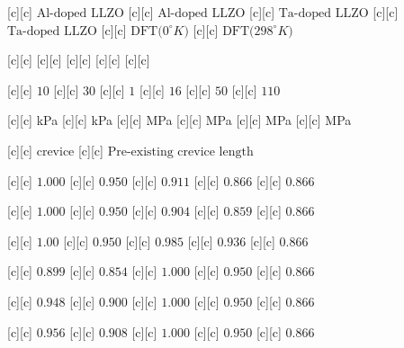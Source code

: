 [c][c] {$\text{Al-doped LLZO}$}
[c][c] {$\text{Al-doped LLZO}$}
[c][c] {$\text{Ta-doped LLZO}$}
[c][c] {$\text{Ta-doped LLZO}$}
[c][c] {$\text{DFT($0^{\circ}K$)}$}
[c][c] {$\text{DFT($298^{\circ}K$)}$}

[c][c] {} 
[c][c] {} 
[c][c] {}
[c][c] {}
[c][c] {}

[c][c] {\footnotesize $10$}
[c][c] {\footnotesize $30$}
[c][c] {\footnotesize $1$}
[c][c] {\footnotesize $16$}
[c][c] {\footnotesize $50$}
[c][c] {\footnotesize $110$}

[c][c] {\footnotesize kPa}
[c][c] {\footnotesize kPa}
[c][c] {\footnotesize MPa}
[c][c] {\footnotesize MPa}
[c][c] {\footnotesize MPa}
[c][c] {\footnotesize MPa}

[c][c] {$\text{crevice}$}
[c][c] {$\text{Pre-existing crevice length}$}

[c][c] {\tiny $1.000$}
[c][c] {\tiny $0.950$}
[c][c] {\tiny $0.911$}
[c][c] {\tiny $0.866$}
[c][c] {\tiny $0.866$}

[c][c] {\tiny $1.000$}
[c][c] {\tiny $0.950$}
[c][c] {\tiny $0.904$}
[c][c] {\tiny $0.859$}
[c][c] {\tiny $0.866$}

[c][c] {\tiny $1.00$}
[c][c] {\tiny $0.950$}
[c][c] {\tiny $0.985$}
[c][c] {\tiny $0.936$}
[c][c] {\tiny $0.866$}

[c][c] {\tiny $0.899$}
[c][c] {\tiny $0.854$}
[c][c] {\tiny $1.000$}
[c][c] {\tiny $0.950$}
[c][c] {\tiny $0.866$}

[c][c] {\tiny $0.948$}
[c][c] {\tiny $0.900$}
[c][c] {\tiny $1.000$}
[c][c] {\tiny $0.950$}
[c][c] {\tiny $0.866$}

[c][c] {\tiny $0.956$}
[c][c] {\tiny $0.908$}
[c][c] {\tiny $1.000$}
[c][c] {\tiny $0.950$}
[c][c] {\tiny $0.866$}


